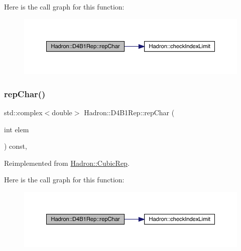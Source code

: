 Here is the call graph for this function\+:
\nopagebreak
\begin{figure}[H]
\begin{center}
\leavevmode
\includegraphics[width=350pt]{d6/d99/structHadron_1_1D4B1Rep_ae49fe8e7bfc46c213d32d7c0d99236f1_cgraph}
\end{center}
\end{figure}
\mbox{\label{structHadron_1_1D4B1Rep_ae49fe8e7bfc46c213d32d7c0d99236f1}} 
\subsubsection{\texorpdfstring{repChar()}{repChar()}\hspace{0.1cm}{\footnotesize\ttfamily [2/2]}}
{\footnotesize\ttfamily std\+::complex$<$double$>$ Hadron\+::\+D4\+B1\+Rep\+::rep\+Char (\begin{DoxyParamCaption}\item[{int}]{elem }\end{DoxyParamCaption}) const\hspace{0.3cm}{\ttfamily [inline]}, {\ttfamily [virtual]}}



Reimplemented from \mbox{\hyperlink{structHadron_1_1CubicRep_af45227106e8e715e84b0af69cd3b36f8}{Hadron\+::\+Cubic\+Rep}}.

Here is the call graph for this function\+:
\nopagebreak
\begin{figure}[H]
\begin{center}
\leavevmode
\includegraphics[width=350pt]{d6/d99/structHadron_1_1D4B1Rep_ae49fe8e7bfc46c213d32d7c0d99236f1_cgraph}
\end{center}
\end{figure}
\mbox{\label{structHadron_1_1D4B1Rep_aaee6044952bae4a4d852115d4e1add07}} 
